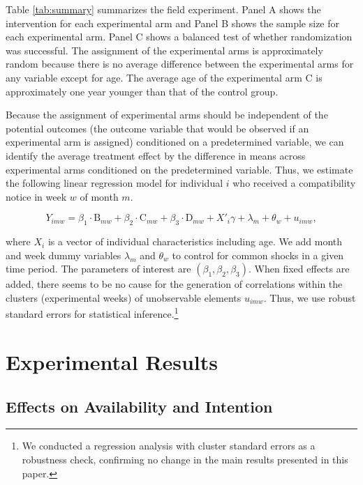 \documentclass[12pt, a4paper]{article}
\begin{document}
Table \ref{tab:summary} summarizes the field experiment. Panel A shows the intervention for each experimental arm and Panel B shows the sample size for each experimental arm. Panel C shows a balanced test of whether randomization was successful. The assignment of the experimental arms is approximately random because there is no average difference between the experimental arms for any variable except for age. The average age of the experimental arm C is approximately one year younger than that of the control group.

Because the assignment of experimental arms should be independent of the potential outcomes (the outcome variable that would be observed if an experimental arm is assigned) conditioned on a predetermined variable, we can identify the average treatment effect by the difference in means across experimental arms conditioned on the predetermined variable. Thus, we estimate the following linear regression model for individual \(i\) who received a compatibility notice in week \(w\) of month \(m\).

\begin{equation}
  Y_{imw} =
  \beta_1 \cdot \text{B}_{mw} + \beta_2 \cdot \text{C}_{mw} + \beta_3 \cdot \text{D}_{mw}
  + X'_i \gamma + \lambda_m + \theta_w + u_{imw}, \label{eq:reg}
\end{equation}

\noindent
where \(X_i\) is a vector of individual characteristics including age. We add month and week dummy variables \(\lambda_m\) and \(\theta_w\) to control for common shocks in a given time period. The parameters of interest are \((\beta_1, \beta_2, \beta_3)\). When fixed effects are added, there seems to be no cause for the generation of correlations within the clusters (experimental weeks) of unobservable elements \(u_{imw}\). Thus, we use robust standard errors for statistical inference.\footnote{We conducted a regression analysis with cluster standard errors as a robustness check, confirming no change in the main results presented in this paper.}

\hypertarget{result}{%
\section{Experimental Results}\label{result}}

\hypertarget{main}{%
\subsection{Effects on Availability and Intention}\label{main}}
\end{document}
